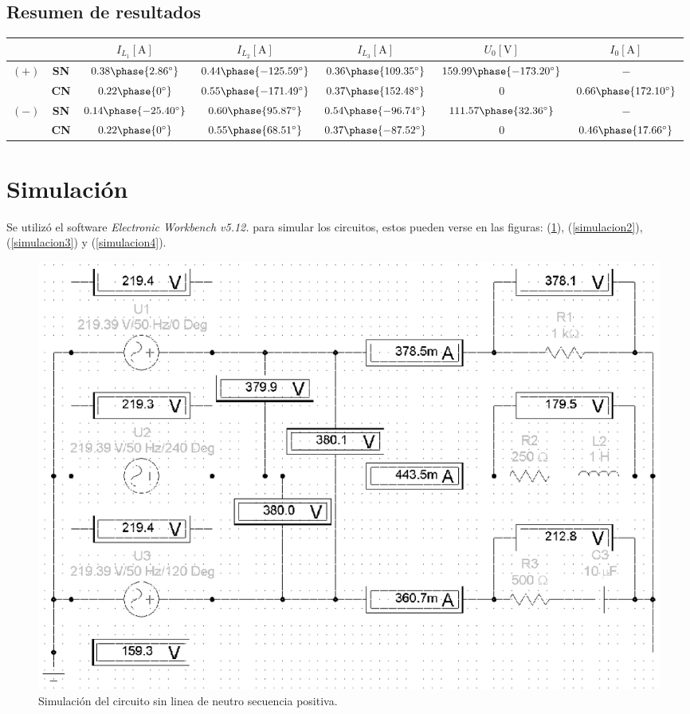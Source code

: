 \documentclass[letter,11pt]{article}
\begin{document}
\subsection{Resumen de resultados}
\begin{center}
    \begin{tabular}{|c|c||c|c|c||c|c|}
    \hline
    \multicolumn{2}{|c||}{} &
    $I_{L_1}[\text{A}]$ & $I_{L_2}[\text{A}]$ & $I_{L_3}[\text{A}]$ &
    $U_0[\text{V}]$ & $I_0[\text{A}]$
    \tabularnewline \hline \hline
    $(+)$ & \textbf{SN} &
    $0.38\phase{2.86^{\circ}}$ &
    $0.44\phase{-125.59^{\circ}}$ &
    $0.36\phase{109.35^{\circ}}$ &
    $159.99\phase{-173.20^{\circ}}$ & $-$
    \tabularnewline \hline
    & \textbf{CN} &
    $0.22\phase{0^{\circ}}$ &
    $0.55\phase{-171.49^{\circ}}$ &
    $0.37\phase{152.48^{\circ}}$ &
    $0$ & $0.66\phase{172.10^{\circ}}$
    \tabularnewline \hline
    $(-)$ & \textbf{SN} &
    $0.14\phase{-25.40^{\circ}}$ &
    $0.60\phase{95.87^{\circ}}$ &
    $0.54\phase{-96.74^{\circ}}$ &
    $111.57\phase{32.36^{\circ}}$ & $-$
    \tabularnewline \hline
    & \textbf{CN} &
    $0.22\phase{0^{\circ}}$ &
    $0.55\phase{68.51^{\circ}}$ &
    $0.37\phase{-87.52^{\circ}}$ &
    $0$ & $0.46\phase{17.66^{\circ}}$
    \tabularnewline \hline
    \end{tabular}
\end{center}

\section{Simulación}
Se utilizó el software \emph{Electronic Workbench v5.12.} para simular
los circuitos, estos pueden verse en las figuras: (\ref{simulacion1}),
(\ref{simulacion2}), (\ref{simulacion3}) y (\ref{simulacion4}).

\begin{figure}[!h]
\centering
\includegraphics[scale=0.99]{simulacion/practica3.1.eps}
\caption{Simulación del circuito sin linea de neutro secuencia positiva.}
\label{simulacion1}
\end{figure}
\end{document}
